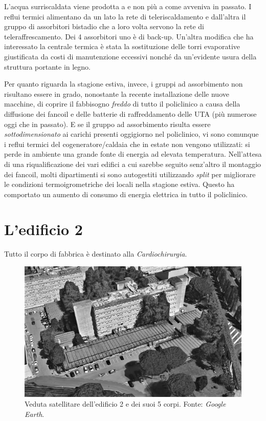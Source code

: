 L'acqua surriscaldata viene prodotta a  e non più a  come avveniva in passato. I reflui termici alimentano da un lato la rete di teleriscaldamento e dall'altra il gruppo di assorbitori bistadio che a loro volta servono la rete di teleraffrescamento. Dei \num{4} assorbitori uno è di back-up. Un'altra modifica che ha interessato la centrale termica è stata la sostituzione delle torri evaporative giustificata da costi di manutenzione eccessivi nonché da un'evidente usura della struttura portante in legno. 

Per quanto riguarda la stagione estiva, invece, i gruppi ad assorbimento non risultano essere in grado, nonostante la recente installazione delle nuove macchine, di coprire il fabbisogno \emph{freddo} di tutto il policlinico a causa della diffusione dei fancoil e delle batterie di raffreddamento delle UTA (più numerose oggi che in passato). E se il gruppo ad assorbimento risulta essere \emph{sottodimensionato} ai carichi presenti oggigiorno nel policlinico, vi sono comunque i reflui termici del cogeneratore/caldaia che in estate non vengono utilizzati: si perde in ambiente una grande fonte di energia ad elevata temperatura. Nell'attesa di una riqualificazione dei vari edifici a cui sarebbe seguito senz'altro il montaggio dei fancoil, molti dipartimenti si sono autogestiti utilizzando \emph{split} per migliorare le condizioni termoigrometriche dei locali nella stagione estiva. Questo ha comportato un aumento di consumo di energia elettrica in tutto il policlinico.

\section{L'edificio 2}
Tutto il corpo di fabbrica è destinato alla \emph{Cardiochirurgia}.
\begin{figure}[t]
	\centering
	\includegraphics[width=\textwidth]{6_2_cap/img/SatellitareED2}
	\caption{Veduta satellitare dell'edificio 2 e dei suoi 5 corpi. Fonte: \emph{Google Earth}.}
\end{figure}

